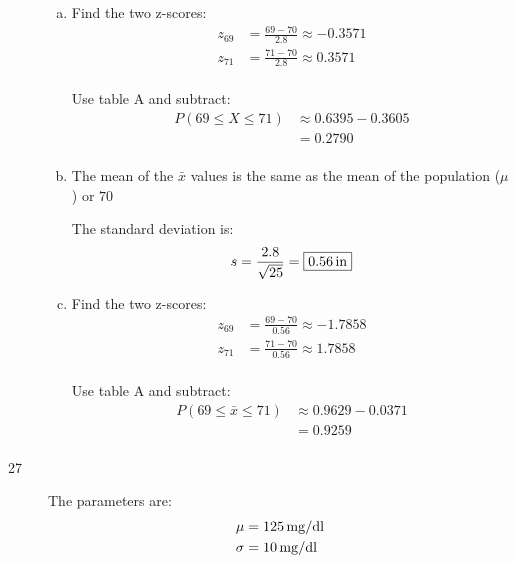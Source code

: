 \documentclass[letterpaper, landscape]{exam}
\begin{document}
\begin{description}
        \begin{enumerate}[(a)]
          \item Find the two z-scores:
            \begin{align*}
              z_{69} &= \frac{69 - 70}{2.8} \approx -0.3571 \\
              z_{71} &= \frac{71 - 70}{2.8} \approx 0.3571 \\
            \end{align*}

            Use table A and subtract:
            \begin{align*}
              P(69 \leq X \leq 71) & \approx 0.6395 - 0.3605 \\
                                   & = \boxed{ 0.2790 } \\
            \end{align*}

          \item 
            The mean of the $\bar{x}$ values is the same as the mean of the
            population ($\mu$) or $\boxed{ 70 }$

            The standard deviation is:
            \[
              s = \frac{2.8}{\sqrt{25}} = \boxed{ \unit[0.56]{in} }
            \]

          \newpage

          \item Find the two z-scores:
            \begin{align*}
              z_{69} &= \frac{69 - 70}{0.56} \approx -1.7858 \\
              z_{71} &= \frac{71 - 70}{0.56} \approx 1.7858 \\
            \end{align*}

            Use table A and subtract:
            \begin{align*}
              P(69 \leq \bar{x} \leq 71) & \approx 0.9629 - 0.0371 \\
                                         & = \boxed{ 0.9259 } \\
            \end{align*}

        \end{enumerate}

      \item[27]
        The parameters are:
        \begin{align*}
          \mu    & = \unit[125]{mg/dl} \\
          \sigma & = \unit[10]{mg/dl} \\
        \end{align*}


\end{description}
\end{document}
